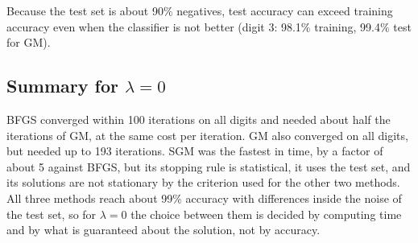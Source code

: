 \documentclass{article}
\begin{document}
Because the test set is about 90\% negatives, test accuracy can exceed training accuracy even when the classifier is not better (digit 3: 98.1\% training, 99.4\% test for GM).

\subsection{Summary for $\lambda=0$}
BFGS converged within 100 iterations on all digits and needed about half the iterations of GM, at the same cost per iteration. GM also converged on all digits, but needed up to 193 iterations. SGM was the fastest in time, by a factor of about 5 against BFGS, but its stopping rule is statistical, it uses the test set, and its solutions are not stationary by the criterion used for the other two methods. All three methods reach about 99\% accuracy with differences inside the noise of the test set, so for $\lambda=0$ the choice between them is decided by computing time and by what is guaranteed about the solution, not by accuracy.


\end{document}
